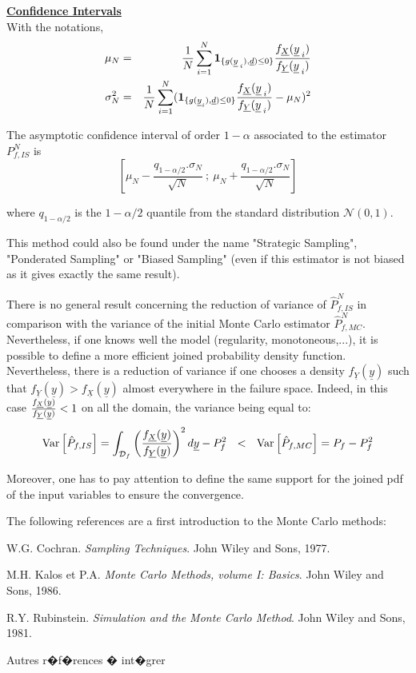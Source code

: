 {\underline{\textbf{Confidence Intervals}}\\
With the notations,
\begin{eqnarray*}
	\mu_N &=& \frac{1}{N}\sum_{i=1}^N \mathbf{1}_{\{g(\underline{y}_{\:i}),\underline{d}) \leq 0 \}}\frac{f_{\underline{X}}(\underline{y}_{\:i})}{f_{\underline{Y}}(\underline{y}_{\:i})}\\
	\sigma_N^2 &=& \frac{1}{N}\sum_{i=1}^N (\mathbf{1}_{\{g(\underline{y}_i),\underline{d}) \leq 0 \}}\frac{f_{\underline{X}}(\underline{y}_{\:i})}{f_{\underline{Y}}(\underline{y}_{\:i})} - \mu_N)^2
\end{eqnarray*}

The asymptotic confidence interval of order $1-\alpha$ associated to the estimator $P_{f,IS}^N$ is 
$$
[ \mu_N - \frac{q_{1-\alpha / 2} . \sigma_N}{\sqrt{N}} \: ; \: \mu_N + \frac{q_{1-\alpha / 2} . \sigma_N}{\sqrt{N}} ]
$$

where $q_{1-\alpha /2}$ is the $1-\alpha / 2$ quantile from the standard distribution $\mathcal N(0,1)$.

}
{
This method could also be found under the name "Strategic Sampling", "Ponderated Sampling" or "Biased Sampling" (even if this estimator is not biased as it gives exactly the same result).
}

{
There is no general result concerning the reduction of variance of $\hat{P}_{f,IS}^N$ in comparison with the variance of the initial Monte Carlo estimator $\hat{P}_{f,MC}^N$. Nevertheless, if one knows well the model (regularity, monotoneous,...), it is possible to define a more efficient joined probability density function.
Nevertheless, there is a reduction of variance if one chooses a density $f_{\underline{Y}}(\underline{y})$ such that $f_{\underline{Y}}(\underline{y})> f_{\underline{X}}(\underline{y})$ almost everywhere in the failure space. Indeed, in this case $\frac{f_{\underline{X}}(\underline{y})}{f_{\underline{Y}}(\underline{y})} < 1$ on all the domain, the variance being equal to:
$$
{\rm Var}\left[ \hat{P}_{f,IS} \right] = \int_{\mathcal D_f} \left( \frac{f_{\underline{X}}(\underline{y})}{f_{\underline{Y}}(\underline{y})} \right)^2 d\underline{y} - P_f^2 \ \ < \ \ {\rm Var}\left[ \hat{P}_{f,MC} \right] = P_f-P_f^2
$$

Moreover, one has to pay attention to define the same support for the joined pdf of the input variables to ensure the convergence.


The following references are a first introduction to the Monte Carlo methods:

W.G. Cochran. \textit{Sampling Techniques}. John Wiley and Sons, 1977.

M.H. Kalos et P.A. \textit{Monte Carlo Methods, volume I: Basics}. John Wiley and Sons, 1986.

R.Y. Rubinstein. \textit{Simulation and the Monte Carlo Method}. John Wiley and Sons, 1981.

Autres r�f�rences � int�grer
 
}

